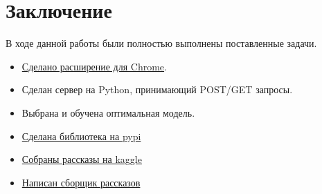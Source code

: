 \documentclass[14pt]{matmex-diploma}
\begin{document}
\section*{Заключение}        
    В ходе данной работы были полностью выполнены поставленные задачи.
        \begin{itemize}
            \item \href{https://github.com/SmirnovAlexander/PoemClassifier}{Сделано расширение для Chrome}.
            \item Сделан сервер на Python, принимающий POST/GET запросы.
            \item Выбрана и обучена оптимальная модель.
            \item \href{https://pypi.org/project/TalesParse/}{Сделана библиотека на pypi} 
            \item \href{https://www.kaggle.com/idoldev/adult-and-child-russian-tales-dataset-with-label}{Собраны рассказы на kaggle}
            \item \href{https://github.com/Feodoros/Scraping_Tales}{Написан сборщик рассказов}            
        \end{itemize}


\setmonofont[Mapping=tex-text]{CMU Typewriter Text}


\end{document}
